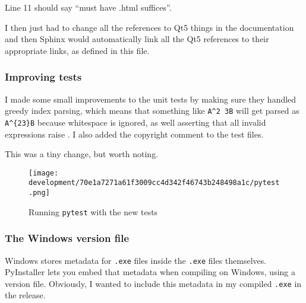 \documentclass[../development.tex]{subfiles}
\begin{document}

Line 11 should say \enquote{must have .html suffices}.


I then just had to change all the references to Qt5 things in the documentation and then Sphinx would automatically link all the Qt5 references to their appropriate links, as defined in this file.

\subsubsection{Improving tests\label{development:preparing-for-v0.2.1:improving-tests}}

I made some small improvements to the unit tests by making sure they handled greedy index parsing, which means that something like \texttt{A\textasciicircum2 3B} will get parsed as \texttt{A\textasciicircum\{23\}B} because whitespace is ignored, as well asserting that all invalid expressions raise . I also added the copyright comment to the test files.

This was a tiny change, but worth noting.



\begin{figure}[H]
	\centering
	\texttt{[image: development/70e1a7271a61f3009cc4d342f46743b248498a1c/pytest.png]}
	\caption{Running \texttt{pytest} with the new tests}
	\label{fig:development:70e1a7271a61f3009cc4d342f46743b248498a1c:pytest.png}
\end{figure}

\subsubsection{The Windows version file\label{development:preparing-for-v0.2.1:the-windows-version-file}}

Windows stores metadata for \texttt{.exe} files inside the \texttt{.exe} files themselves\cite{msdocs-version-information-structures}\cite{msdocs-versioninfo-resource}. PyInstaller lets you embed that metadata when compiling on Windows, using a version file\cite{pyintaller-4.10-capturing-windows-version-data}. Obviously, I wanted to include this metadata in my compiled \texttt{.exe} in the release.
\end{document}
